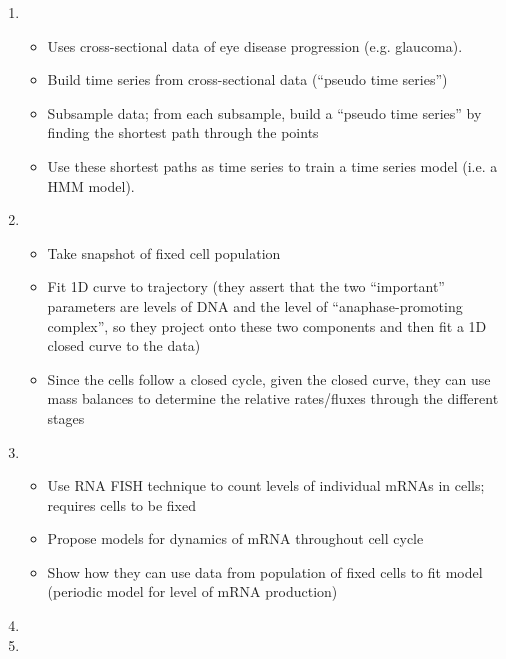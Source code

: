 \documentclass[12pt]{article}
\begin{document}
\begin{enumerate}
\item {}
\begin{itemize}
	\item Uses cross-sectional data of eye disease progression (e.g. glaucoma).
	\item Build time series from cross-sectional data (``pseudo time series'')
	\item Subsample data; from each subsample, build a ``pseudo time series'' by finding the shortest path through the points
	\item Use these shortest paths as time series to train a time series model (i.e. a HMM model).
\end{itemize}

\item {}
\begin{itemize}
	\item Take snapshot of fixed cell population
	\item Fit 1D curve to trajectory (they assert that the two ``important'' parameters are levels of DNA and the level of ``anaphase-promoting complex'', so they project onto these two components and then fit a 1D closed curve to the data)
	\item Since the cells follow a closed cycle, given the closed curve, they can use mass balances to determine the relative rates/fluxes through the different stages
\end{itemize}

\item {}

\begin{itemize}
	\item Use RNA FISH technique to count levels of individual mRNAs in cells; requires cells to be fixed
	\item Propose models for dynamics of mRNA throughout cell cycle
	\item Show how they can use data from population of fixed cells to fit model (periodic model for level of mRNA production)
\end{itemize}

\item {}

\item {}


\end{enumerate}
\end{document}

